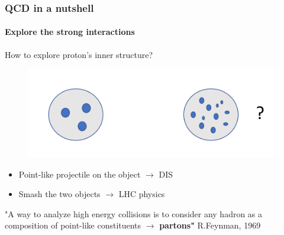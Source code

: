 \documentclass[aspectratio=43]{beamer}
\begin{document}
\begin{frame}

	\frametitle{QCD in a nutshell}
	\framesubtitle{Explore the strong interactions}
	
	How to explore proton's inner structure?
	
	\begin{figure}
		\includegraphics[width = 0.5\linewidth]{plots/protons.png}
	\end{figure}
	
	
	\begin{itemize}
		\item Point-like projectile on the object $\longrightarrow$ DIS
		\item Smash the two objects $\longrightarrow$ LHC physics
	\end{itemize}
	
	{\color{blue}"A way to analyze high energy collisions is to consider any hadron as a composition of point-like constituents $\longrightarrow$ \textbf{partons"} } R.Feynman, 1969 

\end{frame}
\end{document}
